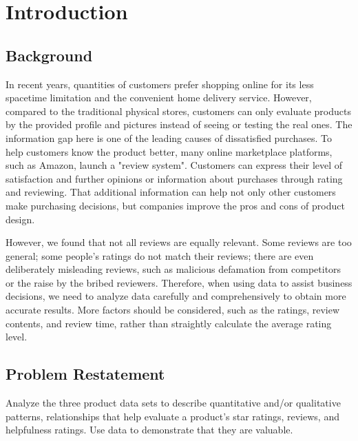 \documentclass{mcmthesis}
\begin{document}
\section{Introduction}
\subsection{Background}
In recent years, quantities of customers prefer shopping online for its less spacetime limitation and the convenient home delivery service. However, compared to the traditional physical stores, customers can only evaluate products by the provided profile and pictures instead of seeing or testing the real ones. The information gap here is one of the leading causes of dissatisfied purchases. To help customers know the product better, many online marketplace platforms, such as Amazon, launch a "review system". Customers can express their level of satisfaction and further opinions or information about purchases through rating and reviewing. That additional information can help not only other customers make purchasing decisions, but companies improve the pros and cons of product design.

However, we found that not all reviews are equally relevant. Some reviews are too general; some people's ratings do not match their reviews; there are even deliberately misleading reviews, such as malicious defamation from competitors or the raise by the bribed reviewers. Therefore, when using data to assist business decisions, we need to analyze data carefully and comprehensively to obtain more accurate results. More factors should be considered, such as the ratings, review contents, and review time, rather than straightly calculate the average rating level.

\subsection{Problem Restatement}
Analyze the three product data sets to describe quantitative and/or qualitative patterns, relationships that help evaluate a product's star ratings, reviews, and helpfulness ratings. Use data to demonstrate that they are valuable.
\end{document}
